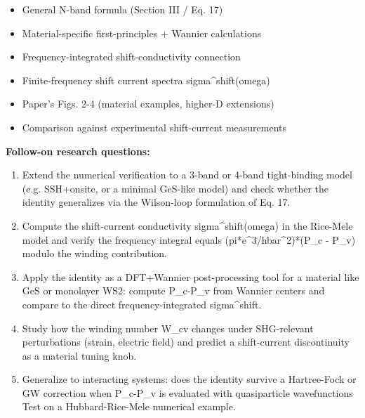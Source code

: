 \begin{itemize}[leftmargin=1.4em,itemsep=0.2em,topsep=0.2em]
\item General N-band formula (Section III / Eq. 17)
\item Material-specific first-principles + Wannier calculations
\item Frequency-integrated shift-conductivity connection
\item Finite-frequency shift current spectra sigma\textasciicircum{}shift(omega)
\item Paper's Figs. 2-4 (material examples, higher-D extensions)
\item Comparison against experimental shift-current measurements
\end{itemize}\noindent\textbf{Follow-on research questions:}
\begin{enumerate}[leftmargin=1.6em,itemsep=0.2em,topsep=0.2em,label=Q\arabic*.]
\item Extend the numerical verification to a 3-band or 4-band tight-binding model (e.g. SSH+onsite, or a minimal GeS-like model) and check whether the identity generalizes via the Wilson-loop formulation of Eq. 17.
\item Compute the shift-current conductivity sigma\textasciicircum{}shift(omega) in the Rice-Mele model and verify the frequency integral equals (pi*e\textasciicircum{}3/hbar\textasciicircum{}2)*(P\_c - P\_v) modulo the winding contribution.
\item Apply the identity as a DFT+Wannier post-processing tool for a material like GeS or monolayer WS2: compute P\_c-P\_v from Wannier centers and compare to the direct frequency-integrated sigma\textasciicircum{}shift.
\item Study how the winding number W\_cv changes under SHG-relevant perturbations (strain, electric field) and predict a shift-current discontinuity as a material tuning knob.
\item Generalize to interacting systems: does the identity survive a Hartree-Fock or GW correction when P\_c-P\_v is evaluated with quasiparticle wavefunctions Test on a Hubbard-Rice-Mele numerical example.
\end{enumerate}

